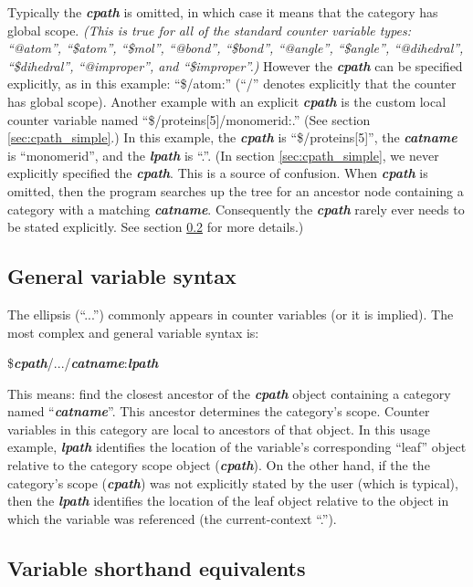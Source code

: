 \documentclass[11pt]{article}
\begin{document}
Typically the \textit{\textbf{cpath}} is omitted, 
in which case it means that the category has global scope. 
\textit{(This is true for all of the standard counter variable types:
``@atom'', ``\$atom'', ``\$mol'',
``@bond'', ``\$bond'',
``@angle'', ``\$angle'',
``@dihedral'', ``\$dihedral'',
``@improper'', and ``\$improper''.)}
However the \textit{\textbf{cpath}} can be specified 
explicitly, as in this example: ``\$/atom:''
(``/'' denotes explicitly that the counter has global scope).
Another example with an explicit \textit{\textbf{cpath}} is
the custom local counter variable named ``\$/proteins[5]/monomerid:.'' 
(See section \ref{sec:cpath_simple}.)
In this example, the \textit{\textbf{cpath}} is ``\$/proteins[5]'', the 
\textit{\textbf{catname}} is ``monomerid'', 
and the \textit{\textbf{lpath}} is ``.''.
(In section 
\ref{sec:cpath_simple}, 
we never explicitly specified the \textit{\textbf{cpath}}. 
This is a source of confusion.
When \textit{\textbf{cpath}} is omitted,
then the program searches up the tree for an ancestor node
containing a category with a matching \textit{\textbf{catname}}.  Consequently
the \textit{\textbf{cpath}} rarely ever needs to be stated explicitly.
See section \ref{sec:variables_shorthand} for more details.)


\subsection{General variable syntax}
The ellipsis (``...'') commonly appears in counter variables 
(or it is implied).  The most complex and general variable syntax is:

\$\textit{\textbf{cpath}}/.../\textit{\textbf{catname}}:\textit{\textbf{lpath}}

This means: find the closest ancestor of the \textit{\textbf{cpath}} object containing a category named ``\textit{\textbf{catname}}''.  This ancestor determines the category's scope.  Counter variables in this category are local to ancestors of that object.  In this usage example, \textit{\textbf{lpath}} identifies the location of the variable's corresponding ``leaf'' object
relative to the category scope object (\textit{\textbf{cpath}}).  
On the other hand, if the the category's scope (\textit{\textbf{cpath}})
was not explicitly stated by the user (which is typical), 
then the \textit{\textbf{lpath}} identifies the location of the leaf object relative to 
the object in which the variable was referenced 
(the current-context ``.'').

\subsection{Variable shorthand equivalents}
\label{sec:variables_shorthand}
\end{document}

